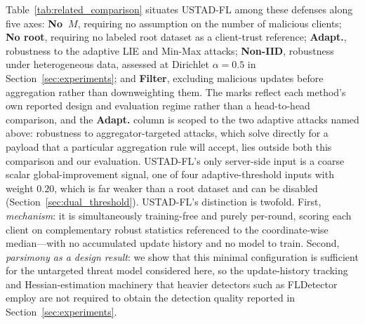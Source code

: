 \documentclass[journal]{IEEEtran}
\begin{document}
Table~\ref{tab:related_comparison} situates USTAD-FL among these defenses along five axes: \textbf{No~$M$}, requiring no assumption on the number of malicious clients; \textbf{No root}, requiring no labeled root dataset as a client-trust reference; \textbf{Adapt.}, robustness to the adaptive LIE and Min-Max attacks; \textbf{Non-IID}, robustness under heterogeneous data, assessed at Dirichlet $\alpha=0.5$ in Section~\ref{sec:experiments}; and \textbf{Filter}, excluding malicious updates before aggregation rather than downweighting them. The marks reflect each method's own reported design and evaluation regime rather than a head-to-head comparison, and the \textbf{Adapt.} column is scoped to the two adaptive attacks named above: robustness to aggregator-targeted attacks, which solve directly for a payload that a particular aggregation rule will accept, lies outside both this comparison and our evaluation. USTAD-FL's only server-side input is a coarse scalar global-improvement signal, one of four adaptive-threshold inputs with weight $0.20$, which is far weaker than a root dataset and can be disabled (Section~\ref{sec:dual_threshold}). USTAD-FL's distinction is twofold. First, \emph{mechanism}: it is simultaneously training-free and purely per-round, scoring each client on complementary robust statistics referenced to the coordinate-wise median---with no accumulated update history and no model to train. Second, \emph{parsimony as a design result}: we show that this minimal configuration is sufficient for the untargeted threat model considered here, so the update-history tracking and Hessian-estimation machinery that heavier detectors such as FLDetector~\cite{zhang2022fldetector} employ are not required to obtain the detection quality reported in Section~\ref{sec:experiments}.
\end{document}
